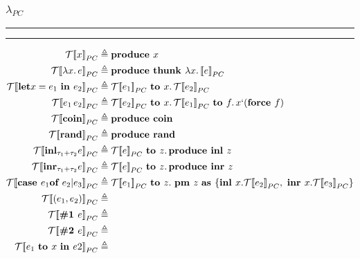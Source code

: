 \documentclass{article}
\DeclareMathOperator*\rrb{]\!]}
\begin{document}
\subsubsection*{$\lambda_{PC}$}	
\hrule\hrule
\medskip
	\begin{equation*}
		\begin{split}
			\mathcal{T} [\![x{\rrb}_{PC} &\triangleq 
			\text{\bf produce } x \\
			\mathcal{T} [\![\lambda x.\, e{\rrb}_{PC} &\triangleq 
			\text{\bf produce thunk } \lambda x.\, \mathcal[\![ e {\rrb}_{PC} \\
			\mathcal{T} [\![\text{\bf let} x = e_1 \text{ \bf in } e_2{\rrb}_{PC} &\triangleq 
			\mathcal{T}[\![e_1{\rrb}_{PC} \text{ \bf to } x.\, \mathcal{T}[\![e_2{\rrb}_{PC}\\
			\mathcal{T} [\![e_1\, e_2{\rrb}_{PC} &\triangleq 
			\mathcal{T}[\![e_2{\rrb}_{PC} \text{ \bf to } x.\, \mathcal{T}[\![e_1{\rrb}_{PC} \text{ \bf to } f.\, x` (\text{\bf force } f)\\
			\mathcal{T} [\![\text{\bf coin}{\rrb}_{PC} &\triangleq 
			\text{\bf produce coin} \\
			\mathcal{T} [\![\text{\bf rand}{\rrb}_{PC} &\triangleq
			\text{\bf produce rand} \\
			\mathcal{T} [\![\text{\bf inl}_{\tau_1 + \tau_2} e{\rrb}_{PC} &\triangleq
			\mathcal{T}[\![e{\rrb}_{PC} \text{ \bf to } z.\, \text{\bf produce inl } z \\
			\mathcal{T} [\![\text{\bf inr}_{\tau_1 + \tau_2} e{\rrb}_{PC} &\triangleq
			\mathcal{T}[\![e{\rrb}_{PC} \text{ \bf to } z.\, \text{\bf produce inr } z \\
			\mathcal{T} [\![\text{\bf case } e_1 \text{\bf of } e_2 | e_3{\rrb}_{PC} &\triangleq
			\mathcal{T}[\![ e_1{\rrb}_{PC} \text{ \bf to } z. \text{ \bf pm } z \text{ \bf as } 
			\{ \text{\bf inl } x. \mathcal{T}[\![ e_2{\rrb}_{PC}, \text{ \bf inr } x. \mathcal{T}[\![ e_3{\rrb}_{PC}\} \\
			\mathcal{T} [\![(e_1, e_2){\rrb}_{PC} &\triangleq \\
			\mathcal{T} [\![\text{\bf \#1 } e{\rrb}_{PC} &\triangleq \\
			\mathcal{T} [\![\text{\bf \#2 } e{\rrb}_{PC} &\triangleq \\
			\mathcal{T} [\![e_1 \text{ \bf to } x \text{ \bf in } e2{\rrb}_{PC} &\triangleq \\
		\end{split}
	\end{equation*}
\end{document}
